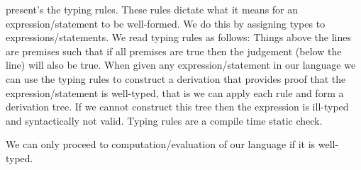  present's the \thePolicyLang typing rules.
These rules dictate what it means for an expression/statement to be well-formed.
We do this by assigning types to expressions/statements.
We read typing rules as follows: Things above the lines are premises such that if all premises are true then the judgement (below the line) will also be true.
When given any expression/statement in our language we can use the typing rules to construct a derivation that provides proof that the expression/statement is well-typed, that is we can apply each rule and form a derivation tree.
If we cannot construct this tree then the expression is ill-typed and syntactically not valid.
Typing rules are a compile time static check.

We can only proceed to computation/evaluation of our language if it is well-typed.
